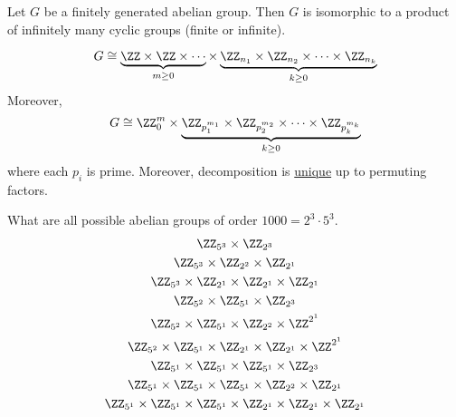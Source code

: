 \documentclass[class=scrartcl, crop=false]{standalone}
\begin{document}
\begin{theorem}
  Let $G$ be a finitely generated abelian group. Then $G$ is isomorphic to a product of infinitely many cyclic groups (finite or infinite).
  \begin{example}
    \[
    G \cong \underbrace{\ZZ \times \ZZ \times \cdots}_{m \geq 0} \times \underbrace{\ZZ_{n_1} \times \ZZ_{n_2} \times \cdots \times \ZZ_{n_k}}_{k \geq 0}
  \]
  Moreover,
  \[
    G \cong \ZZ^m_0 \times \underbrace{\ZZ_{p_1^{m_1}} \times \ZZ_{p_2^{m_2}} \times \cdots \times \ZZ_{p_k^{m_k}}}_{k \geq 0}
  \]
  where each $p_i$ is prime. Moreover, decomposition is \ul{unique} up to permuting factors.
  \end{example}
\end{theorem}

\begin{example}
  What are all possible abelian groups of order $1000 = 2^3 \cdot 5^3$.
  \begin{gather*}
    \ZZ_{5^3} \times \ZZ_{2^3} \\
    \ZZ_{5^3} \times \ZZ_{2^2} \times \ZZ_{2^1} \\
    \ZZ_{5^3} \times \ZZ_{2^1} \times \ZZ_{2^1} \times \ZZ_{2^1} \\
    \ZZ_{5^2} \times \ZZ_{5^1} \times \ZZ_{2^3} \\
    \ZZ_{5^2} \times \ZZ_{5^1} \times \ZZ_{2^2} \times \ZZ^{2^1} \\
    \ZZ_{5^2} \times \ZZ_{5^1} \times \ZZ_{2^1} \times \ZZ_{2^1} \times \ZZ^{2^1} \\
    \ZZ_{5^1} \times \ZZ_{5^1} \times \ZZ_{5^1} \times \ZZ_{2^3} \\
    \ZZ_{5^1} \times \ZZ_{5^1} \times \ZZ_{5^1} \times \ZZ_{2^2} \times \ZZ_{2^1} \\
    \ZZ_{5^1} \times \ZZ_{5^1} \times \ZZ_{5^1} \times \ZZ_{2^1} \times \ZZ_{2^1} \times \ZZ_{2^1} \\
  \end{gather*}
\end{example}
\end{document}
